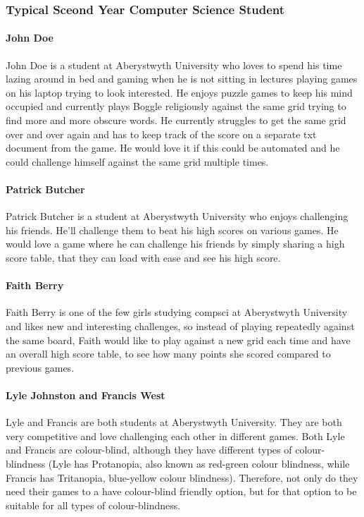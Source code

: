 \documentclass{project}
\begin{document}
	\subsubsection{Typical Sceond Year Computer Science Student}
		\paragraph{John Doe}
			John Doe is a student at Aberystwyth University who loves to spend his time lazing around in bed and gaming when he is not sitting in lectures playing games on his laptop trying to look interested. He enjoys puzzle games to keep his mind occupied and currently plays Boggle religiously against the same grid trying to find more and more obscure words. He currently struggles to get the same grid over and over again and has to keep track of the score on a separate txt document from the game. He would love it if this could be automated and he could challenge himself against the same grid multiple times.
		\paragraph{Patrick Butcher}
			Patrick Butcher is a student at Aberystwyth University who enjoys challenging his friends. He'll challenge them to beat his high scores on various games. He would love a game where he can challenge his friends by simply sharing a high score table, that they can load with ease and see his high score.
		\paragraph{Faith Berry}
			Faith Berry is one of the few girls studying compsci at Aberystwyth University and likes new and interesting challenges, so instead of playing repeatedly against the same board, Faith would like to play against a new grid each time and have an overall high score table, to see how many points she scored compared to previous games.
		\paragraph{Lyle Johnston and Francis West}
		    Lyle and Francis are both students at Aberystwyth University. They are both very competitive and love challenging each other in different games. Both Lyle and Francis are colour-blind, although they have different types of colour-blindness (Lyle has Protanopia, also known as red-green colour blindness, while Francis has Tritanopia, blue-yellow colour blindness). Therefore, not only do they need their games to a have colour-blind friendly option, but for that option to be suitable for all types of colour-blindness.
		    
\end{document}
